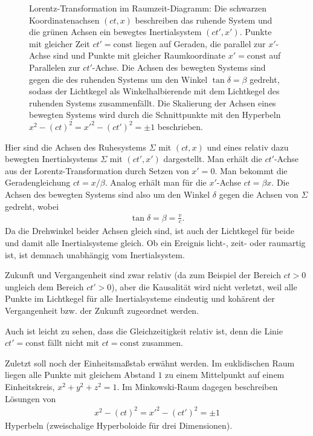 \begin{figure}[htp]
    \centering
    \tfigMinkowskiDiagramB
    \caption{Lorentz-Transformation im Raumzeit-Diagramm: Die schwarzen Koordinatenachsen $(ct,x)$ beschreiben das ruhende System und die grünen Achsen ein bewegtes Inertialsystem $(ct',x')$.
    Punkte mit gleicher Zeit $ct'=\mathrm{const}$ liegen auf Geraden, die parallel zur $x'$-Achse sind und Punkte mit gleicher Raumkoordinate $x'=\mathrm{const}$ auf Parallelen zur $ct'$-Achse.
    Die Achsen des bewegten Systems sind gegen die des ruhenden Systems um den Winkel $\tan\delta=\beta$ gedreht, sodass der Lichtkegel als Winkelhalbierende mit dem Lichtkegel des ruhenden Systems zusammenfällt.
    Die Skalierung der Achsen eines bewegten Systems wird durch die Schnittpunkte mit den Hyperbeln $x^2-(ct)^2={x'}^2-(ct')^2=\pm1$ beschrieben. }
    \label{fig:minkowski_diagramB}
\end{figure}

Hier sind die Achsen des Ruhesystems $\Sigma$ mit $(ct,x)$ und eines relativ dazu bewegten Inertialsystems $\Sigma$ mit $(ct',x')$ dargestellt.
Man erhält die $ct'$-Achse aus der Lorentz-Transformation durch Setzen von $x'=0$. Man bekommt die Geradengleichung $ct=x/\beta$.
Analog erhält man für die $x'$-Achse $ct=\beta x$.
Die Achsen des bewegten Systems sind also um den Winkel $\delta$ gegen die Achsen von $\Sigma$ gedreht, wobei
\begin{align*}
    \tan\delta=\beta=\frac{v}{c}.
\end{align*}
Da die Drehwinkel beider Achsen gleich sind, ist auch der Lichtkegel für beide und damit alle Inertialsysteme gleich.
Ob ein Ereignis licht-, zeit- oder raumartig ist, ist demnach unabhängig vom Inertialsystem.

Zukunft und Vergangenheit sind zwar relativ (da zum Beispiel der Bereich $ct>0$ ungleich dem Bereich $ct'>0$), aber die Kausalität wird nicht verletzt,
weil alle Punkte im Lichtkegel für alle Inertialsysteme eindeutig und kohärent der Vergangenheit bzw. der Zukunft zugeordnet werden.

Auch ist leicht zu sehen, dass die Gleichzeitigkeit relativ ist, denn die Linie $ct'=\mathrm{const}$ fällt nicht mit $ct=\mathrm{const}$ zusammen.

Zuletzt soll noch der Einheitsmaßstab erwähnt werden.
Im euklidischen Raum liegen alle Punkte mit gleichem Abstand $1$ zu einem Mittelpunkt auf einem Einheitskreis, $x^2+y^2+z^2=1$.
Im Minkowski-Raum dagegen beschreiben Lösungen von
\begin{align*}
    x^2-(ct)^2={x'}^2-(ct')^2=\pm1
\end{align*}
Hyperbeln (zweischalige Hyperboloide für drei Dimensionen).



